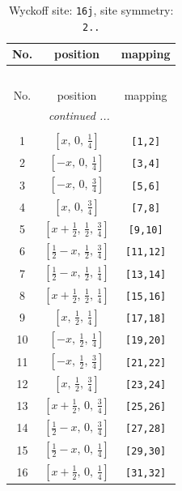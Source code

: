 \documentclass[fleqn,8pt]{jsarticle}
\begin{document}
\renewcommand{\arraystretch}{1.2}
\begin{longtable}{ccc}
\caption{Wyckoff site: {\tt 16j}, site symmetry: {\tt 2..}}
 \\
 \hline \hline
No. & position & mapping \\ \hline \endfirsthead

\multicolumn{2}{l}{\tablename\ \thetable{}} \\
 \hline \hline
No. & position & mapping \\ \hline \endhead

 \hline \hline
\multicolumn{2}{r}{\footnotesize\it continued ...} \\ \endfoot

 \hline \hline
\multicolumn{2}{r}{} \\ \endlastfoot

1 & $\left[ x,\, 0,\, \frac{1}{4} \right]$ & {\tt [1,2]} \\ \hline
2 & $\left[ - x,\, 0,\, \frac{1}{4} \right]$ & {\tt [3,4]} \\ \hline
3 & $\left[ - x,\, 0,\, \frac{3}{4} \right]$ & {\tt [5,6]} \\ \hline
4 & $\left[ x,\, 0,\, \frac{3}{4} \right]$ & {\tt [7,8]} \\ \hline
5 & $\left[ x + \frac{1}{2},\, \frac{1}{2},\, \frac{3}{4} \right]$ & {\tt [9,10]} \\ \hline
6 & $\left[ \frac{1}{2} - x,\, \frac{1}{2},\, \frac{3}{4} \right]$ & {\tt [11,12]} \\ \hline
7 & $\left[ \frac{1}{2} - x,\, \frac{1}{2},\, \frac{1}{4} \right]$ & {\tt [13,14]} \\ \hline
8 & $\left[ x + \frac{1}{2},\, \frac{1}{2},\, \frac{1}{4} \right]$ & {\tt [15,16]} \\ \hline
9 & $\left[ x,\, \frac{1}{2},\, \frac{1}{4} \right]$ & {\tt [17,18]} \\ \hline
10 & $\left[ - x,\, \frac{1}{2},\, \frac{1}{4} \right]$ & {\tt [19,20]} \\ \hline
11 & $\left[ - x,\, \frac{1}{2},\, \frac{3}{4} \right]$ & {\tt [21,22]} \\ \hline
12 & $\left[ x,\, \frac{1}{2},\, \frac{3}{4} \right]$ & {\tt [23,24]} \\ \hline
13 & $\left[ x + \frac{1}{2},\, 0,\, \frac{3}{4} \right]$ & {\tt [25,26]} \\ \hline
14 & $\left[ \frac{1}{2} - x,\, 0,\, \frac{3}{4} \right]$ & {\tt [27,28]} \\ \hline
15 & $\left[ \frac{1}{2} - x,\, 0,\, \frac{1}{4} \right]$ & {\tt [29,30]} \\ \hline
16 & $\left[ x + \frac{1}{2},\, 0,\, \frac{1}{4} \right]$ & {\tt [31,32]} \\
\end{longtable}
\end{document}
